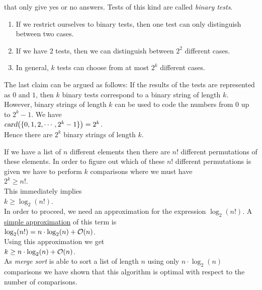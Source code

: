 that only give yes or no answers.  Tests of this kind are called \emph{binary tests}.
\begin{enumerate}
\item If we restrict ourselves to binary tests, then one test can only distinguish between two cases.
\item If we have $2$ tests, then we can distinguish between  $2^2$ different cases.
\item In general, $k$ tests can choose from at most $2^k$ different cases.
\end{enumerate}
The last claim can be argued as follows:  If the results of the tests are represented as
$0$ and $1$, then $k$ binary tests correspond to a binary string of length
$k$.  However, binary strings of length $k$ can be used to code the numbers from $0$ up to
$2^{k}-1$.  We have
\\[0.2cm]
\hspace*{1.3cm}
$\textsl{card}\bigl(\{0,1,2,\cdots, 2^k-1\}\bigr) = 2^k$.
\\[0.2cm]
Hence there are $2^k$ binary strings of length $k$.  

If we have a list of $n$ different elements then there are $n!$ different permutations of these
elements.  In order to figure out which of these $n!$ different permutations is given we have to
perform $k$ comparisons where we must have
\\[0.2cm]
\hspace*{1.3cm}
$2^k \geq n!$.
\\[0.2cm]
This immediately implies
\\[0.2cm]
\hspace*{1.3cm}
$k \geq \log_2(n!)$.
\\[0.2cm]
In order to proceed, we need an approximation for the expression $\log_2(n!)$.  
A \href{http://en.wikipedia.org/wiki/Stirling's_approximation}{simple approximation} of this term is
\\[0.2cm]
\hspace*{1.3cm}
$\log_2(n!) = n \cdot \log_2(n) + \mathcal{O}(n)$.
\\[0.2cm]
Using this approximation we get
\\[0.2cm]
\hspace*{1.3cm}
$k \geq n \cdot \log_2(n) + \mathcal{O}(n)$.
\\[0.2cm]
As \emph{merge sort} is able to sort a list of length $n$ using only $n \cdot \log_2(n)$ comparisons
we have shown that this algorithm is optimal with respect to the number of comparisons.


